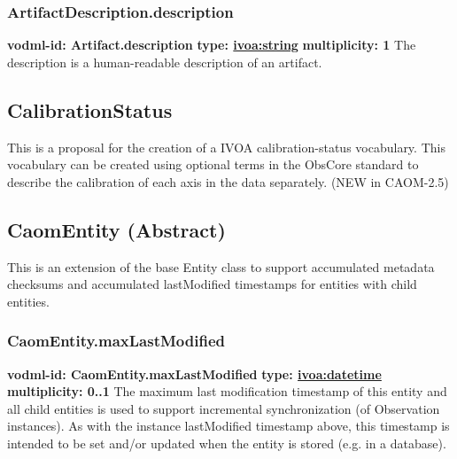     \subsubsection{ArtifactDescription.description}
      \textbf{vodml-id: Artifact.description} \newline
      \textbf{type: \hyperref[sect:ivoa]{ivoa:string}} \newline
      \textbf{multiplicity: 1} \newline
      The description is a human-readable description of an artifact.

  \subsection{CalibrationStatus}
  \label{sect:CalibrationStatus}
    This is a proposal for the creation of a IVOA calibration-status vocabulary. This vocabulary can be created using optional terms in the ObsCore standard to describe the calibration of each axis in the data separately. (NEW in CAOM-2.5)

  \subsection{CaomEntity (Abstract)}
  \label{sect:CaomEntity}
    This is an extension of the base Entity class to support accumulated metadata checksums and accumulated lastModified timestamps for entities with child entities.

    \subsubsection{CaomEntity.maxLastModified}
      \textbf{vodml-id: CaomEntity.maxLastModified} \newline
      \textbf{type: \hyperref[sect:ivoa]{ivoa:datetime}} \newline
      \textbf{multiplicity: 0..1} \newline
      The maximum last modification timestamp of this entity and all child entities is used to support incremental synchronization (of Observation instances). As with the instance lastModified timestamp above, this timestamp is intended to be set and/or updated when the entity is stored (e.g. in a database).

